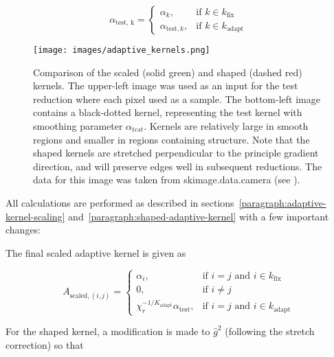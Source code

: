 \begin{equation}
    \alpha_{\text{test, k}} = \begin{cases}
        \alpha_k, & \textrm{if } k \in k_\text{fix} \\
        \alpha_{\text{test}, k}, & \textrm{if } k \in k_\text{adapt}
    \end{cases}
    \label{eq:equation63}
\end{equation}

\begin{figure}[H]
  \begin{center}
  \texttt{[image: images/adaptive\_kernels.png]}
  \caption{Comparison of the scaled (solid green) and shaped (dashed
           red) kernels.  The upper-left image was used as an input for the
           test reduction where each pixel used as a sample.  The bottom-left
           image contains a black-dotted kernel, representing the test kernel
           with smoothing parameter $\alpha_{test}$.  Kernels are relatively
           large in smooth regions and smaller in regions containing structure.
           Note that the shaped kernels are stretched perpendicular to the
           principle gradient direction, and will preserve edges well in
           subsequent reductions.  The data for this image was taken
           from skimage.data.camera (see \cite{skimage2014}).}
  \label{fig:adaptive-kernels}
  \end{center}
\end{figure}

All calculations are performed as described in
sections~\ref{paragraph:adaptive-kernel-scaling}
and~\ref{paragraph:shaped-adaptive-kernel} with a few important changes:

The final scaled adaptive kernel is given as

\begin{equation}
    A_{\text{scaled}, (i,j)} = \begin{cases}
        \alpha_i, & \textrm{if } i=j \textrm{ and } i \in k_{\text{fix}} \\
        0,& \textrm{if } i \neq j \\
        \chi_r^{-1/K_{\text{adapt}}} \alpha_{\text{test}},&
        \textrm{if } i=j \textrm{ and } i \in k_{\text{adapt}}
    \end{cases}
    \label{eq:equation65}
\end{equation}

For the shaped kernel, a modification is made to $\hat{g}^2$ (following the
stretch correction) so that


